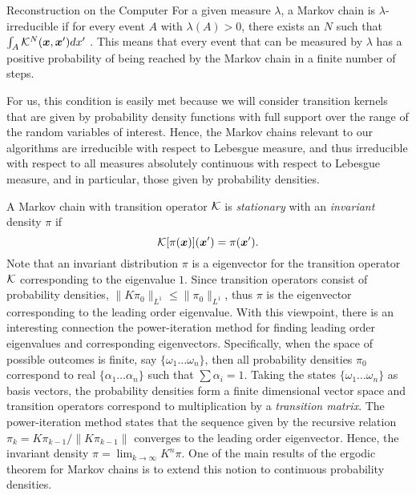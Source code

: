 \begin{chapter}{Reconstruction on the Computer}
For a given measure $\lambda$, a Markov chain is $\lambda$-irreducible if for every event $A$ with $\lambda(A) > 0$, there exists an $N$ such that $\int_A \mathcal K^N(\mbox{\boldmath$x$},\mbox{\boldmath$x$}')dx'$ \citep{robert2013monte}. 
This means that every event that can be measured by $\lambda$ has a positive probability of being reached by the Markov chain in a finite number of steps.

For us, this condition is easily met because we will consider transition kernels that are given by probability density functions with full support over the range of the random variables of interest. 
Hence, the Markov chains relevant to our algorithms are irreducible with respect to Lebesgue measure, and thus irreducible with respect to all measures absolutely continuous with respect to Lebesgue measure, and in particular, those given by probability densities.

A Markov chain with transition operator $\mathcal K$ is \emph{stationary} with an \emph{invariant} density $\pi$ if 
\begin{equation} \label{eq:stationarity}
  \mathcal K [\pi(\mbox{\boldmath$x$})](\mbox{\boldmath$x$}') = \pi(\mbox{\boldmath$x$}').
\end{equation}
Note that an invariant distribution $\pi$ is a eigenvector for the transition operator $\mathcal K$ corresponding to the eigenvalue $1$.
Since transition operators consist of probability densities, $\|K\pi_0\|_{L^1} \le \|\pi_0\|_{L^1}$, thus $\pi$ is the eigenvector corresponding to the leading order eigenvalue.
With this viewpoint, there is an interesting connection the power-iteration method for finding leading order eigenvalues and corresponding eigenvectors.
Specifically, when the space of possible outcomes is finite, say $\{\omega_1\dots \omega_n\}$, then all probability densities $\pi_0$ correspond to real $\{\alpha_1\dots\alpha_n\}$ such that $\sum\alpha_i = 1$.
Taking the states $\{\omega_1\dots \omega_n\}$ as basis vectors, the probability densities form a finite dimensional vector space and transition operators correspond to multiplication by a \emph{transition matrix}.
The power-iteration method states that the sequence given by the recursive relation $\pi_k = K\pi_{k-1}/\|K\pi_{k-1}\|$ converges to the leading order eigenvector. 
Hence, the invariant density $\pi = \lim_{k\to \infty}K^n \pi$.
One of the main results of the ergodic theorem for Markov chains is to extend this notion to continuous probability densities.


\end{chapter}
